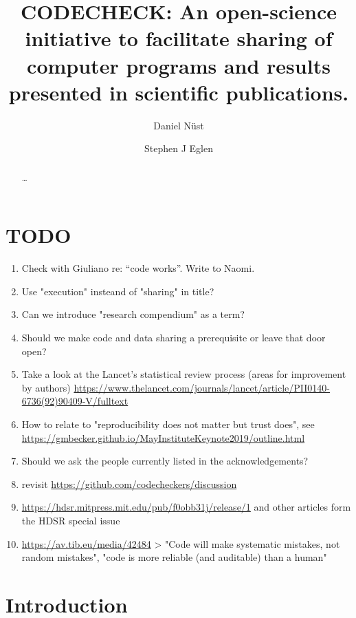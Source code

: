 \documentclass[12pt]{article}
\begin{document}
\title{CODECHECK: An open-science initiative to facilitate sharing of
  computer programs and results presented in scientific publications.}
\author[1,$\ast$]{Daniel N\"{u}st}
\author[2,$\ast$]{Stephen J Eglen}
\maketitle
\begin{abstract}
\ldots{}
\end{abstract}

\section*{TODO}\label{todo}

\begin{enumerate}
\item Check with Giuliano re: ``code works''. Write to Naomi.
\item Use "execution" insteand of "sharing" in title?
\item Can we introduce "research compendium" as a term?
\item Should we make code and data sharing a prerequisite or leave that door open?
\item Take a look at the Lancet's statistical review process (areas for improvement by authors) \url{https://www.thelancet.com/journals/lancet/article/PII0140-6736(92)90409-V/fulltext}
\item How to relate to "reproducibility does not matter but trust does", see \url{https://gmbecker.github.io/MayInstituteKeynote2019/outline.html}
\item Should we ask the people currently listed in the acknowledgements?
\item revisit \url{https://github.com/codecheckers/discussion}
\item \url{https://hdsr.mitpress.mit.edu/pub/f0obb31j/release/1} and other articles form the HDSR special issue
\item \url{https://av.tib.eu/media/42484} > "Code will make systematic mistakes, not random mistakes", "code is more reliable (and auditable) than a human"
\end{enumerate}

\section*{Introduction}\label{introduction}
\end{document}
